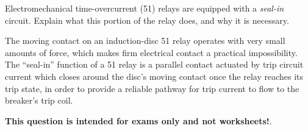 

Electromechanical time-overcurrent (51) relays are equipped with a {\it seal-in} circuit.  Explain what this portion of the relay does, and why it is necessary.







The moving contact on an induction-disc 51 relay operates with very small amounts of force, which makes firm electrical contact a practical impossibility.  The ``seal-in'' function of a 51 relay is a parallel contact actuated by trip circuit current which closes around the disc's moving contact once the relay reaches its trip state, in order to provide a reliable pathway for trip current to flow to the breaker's trip coil.







{\bf This question is intended for exams only and not worksheets!}.



